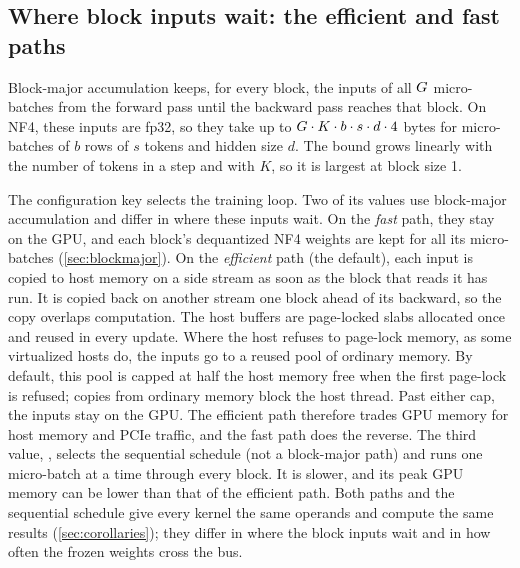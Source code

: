 %
\subsection{Where block inputs wait: the efficient and fast paths}\label{sec:paths}

Block-major accumulation keeps, for every block, the inputs of all $G$
micro-batches from the forward pass until the backward pass reaches that
block.  On NF4, these inputs are fp32, so they take up to
$G\cdot K\cdot b\cdot s\cdot d\cdot 4$ bytes for micro-batches of $b$ rows
of $s$ tokens and hidden size $d$.  The bound grows linearly with the
number of tokens in a step and with $K$, so it is largest at block size 1.

The configuration key  selects the training loop.  Two of its
values use block-major accumulation and differ in where these inputs wait.
On the \emph{fast} path, they stay on the GPU, and each block's dequantized
NF4 weights are kept for all its micro-batches (\cref{sec:blockmajor}).  On
the \emph{efficient} path (the default), each input is copied to host
memory on a side stream as soon as the block that reads it has run.  It is
copied back on another stream one block ahead of its backward, so the copy
overlaps computation.  The host buffers are page-locked slabs allocated once
and reused in every update.  Where the host refuses to page-lock memory, as
some virtualized hosts do, the inputs go to a reused pool of ordinary
memory.  By default, this pool is capped at half the host memory free when
the first page-lock is refused; copies from ordinary memory block the host
thread.  Past either cap, the inputs stay on the GPU.  The efficient path
therefore trades GPU memory for host memory and PCIe traffic, and the fast
path does the reverse.
The third value, , selects the sequential schedule (not a block-major path) and runs one micro-batch at a time through every block.
It is slower, and its peak GPU memory can be lower than that of the efficient path.
Both paths and the sequential schedule give every kernel the same operands and compute the same results (\cref{sec:corollaries}); they differ in where the block inputs wait and in how often the frozen weights cross the bus.

